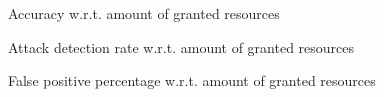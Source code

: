 \documentclass[twocolumn]{bmcart}%
\begin{document}

\begin{figure}[!ht]
    \label{fig1}
    \caption{Accuracy w.r.t. amount of granted resources}
\end{figure}

\begin{figure}[!ht]
    \label{fig1}
    \caption{Attack detection rate w.r.t. amount of granted resources}
\end{figure}

\begin{figure}[!ht]
    \label{fig1}
    \caption{False positive percentage w.r.t. amount of granted resources}
\end{figure}
\end{document}

